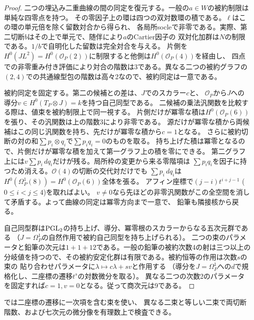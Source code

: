\begin{proof}
二つの埋込み二重曲線の間の同定を復元する。一般の$a\in W$の被約制限は単純な四零点を持つ。
その零因子上の環は四つの双対数環の積である。$\ell$はこの環の単元倍を除く留数対合から得られ、
各局所socleで非零である。実際、第二切断$b$はその上で単元で、随伴により$a$のCartier因子の
双対化加群は$N$の制限である。$1/b$で自明化した留数は完全対合を与える。
片側を$H^0(JL^2)=H^0(\mathcal O_P(2))$に制限すると他側は$H^0(\mathcal O_P(4))$を経由し、
四点での非零重み付き評価により対合の階数は3である。異なる二つの被約グラフの
$(2,4)$での共通線型包の階数は高々2なので、被約同定は一意である。

被約同定を固定する。第二の候補との差は、$J$でのスカラー$c$と、
$\mathcal O_P$から$J$への導分$v\in H^0(T_P\otimes J)=k$を持つ自己同型である。
二候補の乗法汎関数を比較する際は、値束を被約制限上で同一視する。
片側だけが冪零な積は$H^0(\mathcal O_P(6))$を張り、その汎関数は上の階数3により非零である。
源だけが冪零な積から両候補はこの同じ汎関数を持ち、先だけが冪零な積から$c=1$となる。
さらに被約切断の対の和$\sum p_i\otimes q_i$で$\sum p_iq_i=0$のものを取る。
持ち上げた積は冪零となるので、片側だけが冪零な積を加えて第一グラフ上の積を零にできる。
第二グラフ上には$v\sum p_i\,dq_i$だけが残る。局所枠の変更から来る零階項は
$\sum p_i q_i$を因子に持つため消える。$\mathcal O(4)$の切断の交代対だけでも
$\sum p_i\,dq_i$は$H^0(\Omega^1_P(8))=H^0(\mathcal O_P(6))$全体を張る。
アフィン座標で$(j-i)t^{i+j-1}$ ($0\le i<j\le4$)を取ればよい。
$v\ne0$なら先ほどの非零汎関数がこの全空間を消して矛盾する。よって曲線の同定は冪零方向まで一意で、
鉛筆も隣接核から戻る。

自己同型群は$\operatorname{PGL}_2$の持ち上げ、導分、冪零根のスカラーからなる五次元群である
（$J=\Omega^1_P$の自然作用で被約自己同型を持ち上げられる）。
二つの束のパラメータと鉛筆の次元は$1+1+12$である。一般の鉛筆の被約次数4の射は三つ以上の
分岐値を持つので、その被約安定化群は有限である。被約恒等の作用は次数$s$の束の
貼り合わせパラメータに$\lambda\mapsto c\lambda+s v$と作用する
（導分を$J=\Omega^1_P$への$d$で規格化し、二座標の遷移$t^s$の対数微分を取る）。
異なる二つの次数2のパラメータを固定すれば$c=1,v=0$となる。従って商次元は9である。
\end{proof}
では二座標の遷移に一次項を含む束を使い、
異なる二束と等しい二束で両切断階数、および七次元の微分像を有理数上で検査できる。

